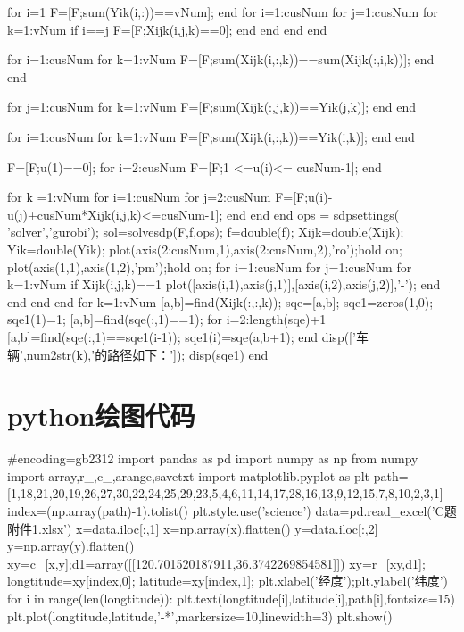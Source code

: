 \documentclass[withoutpreface,bwprint]{cumcmthesis} %
\begin{document}
\begin{appendices}
\begin{matlab}
for i=1
    F=[F;sum(Yik(i,:))==vNum];%
end
for i=1:cusNum
    for j=1:cusNum
        for k=1:vNum
            if i==j
                F=[F;Xijk(i,j,k)==0];           %
            end
        end
    end
end

for i=1:cusNum
    for k=1:vNum
        F=[F;sum(Xijk(i,:,k))==sum(Xijk(:,i,k))];%
    end
end


for j=1:cusNum
    for k=1:vNum
        F=[F;sum(Xijk(:,j,k))==Yik(j,k)];%
    end
end

for i=1:cusNum
    for k=1:vNum
        F=[F;sum(Xijk(i,:,k))==Yik(i,k)];%
    end
end

F=[F;u(1)==0];
for i=2:cusNum
    F=[F;1 <=u(i)<= cusNum-1];
end

for k =1:vNum
    for i=1:cusNum
        for j=2:cusNum
            F=[F;u(i)-u(j)+cusNum*Xijk(i,j,k)<=cusNum-1];
        end
    end
end
ops = sdpsettings( 'solver','gurobi');
sol=solvesdp(F,f,ops);
f=double(f);
Xijk=double(Xijk);
Yik=double(Yik);
plot(axis(2:cusNum,1),axis(2:cusNum,2),'ro');hold on;
plot(axis(1,1),axis(1,2),'pm');hold on;
for i=1:cusNum
    for j=1:cusNum
        for k=1:vNum
            if Xijk(i,j,k)==1
                plot([axis(i,1),axis(j,1)],[axis(i,2),axis(j,2)],'-');
            end
        end
    end
end
for k=1:vNum
    [a,b]=find(Xijk(:,:,k));
    sqe=[a,b];
    sqe1=zeros(1,0);
    sqe1(1)=1;
    [a,b]=find(sqe(:,1)==1);
    for i=2:length(sqe)+1
        [a,b]=find(sqe(:,1)==sqe1(i-1));
        sqe1(i)=sqe(a,b+1);
    end
    disp(['车辆',num2str(k),'的路径如下：']);
    disp(sqe1)
end
\end{matlab}
	
	
	
	
	
\section{python绘图代码}
\begin{python}
#encoding=gb2312
import pandas as pd
import numpy as np
from numpy import array,r_,c_,arange,savetxt
import matplotlib.pyplot as plt
path=[1,18,21,20,19,26,27,30,22,24,25,29,23,5,4,6,11,14,17,28,16,13,9,12,15,7,8,10,2,3,1]
index=(np.array(path)-1).tolist()
plt.style.use('science')
data=pd.read_excel('C题附件1.xlsx')
x=data.iloc[:,1]
x=np.array(x).flatten()
y=data.iloc[:,2]
y=np.array(y).flatten()
xy=c_[x,y];d1=array([[120.701520187911,36.3742269854581]])
xy=r_[xy,d1];
longtitude=xy[index,0]; latitude=xy[index,1];
plt.xlabel('经度');plt.ylabel('纬度')
for i in range(len(longtitude)):
    plt.text(longtitude[i],latitude[i],path[i],fontsize=15)
plt.plot(longtitude,latitude,'-*',markersize=10,linewidth=3)
plt.show()
\end{python}
	

	
	
	
	
	
	

\end{appendices}
\end{document}
